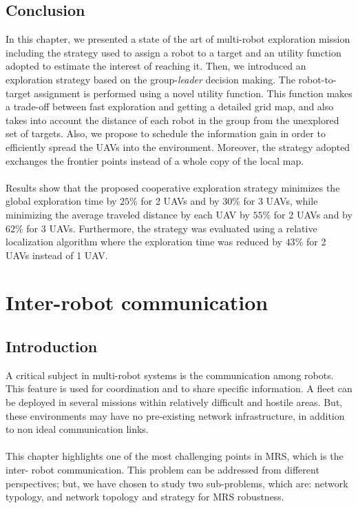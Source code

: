 \documentclass[11pt,openany]{book}
\begin{document}
\section{Conclusion}
In this chapter, we presented a state of the art of multi-robot exploration mission including the strategy used to assign a robot to a target and an utility function adopted to estimate the interest of reaching it. Then, we introduced an exploration strategy based on the group-\textit{leader} decision making. The robot-to-target assignment is performed using a novel utility function. This function makes a trade-oﬀ between fast exploration and getting a detailed grid map, and also takes into account the distance of each robot in the group from the unexplored set of targets. Also, we propose to schedule the information gain in order to efficiently spread the UAVs into the environment. Moreover, the strategy adopted exchanges the frontier points instead of a whole copy of the local map.\\\\
Results show that the proposed cooperative exploration strategy minimizes the global exploration time by $25\%$ for 2 UAVs and by $30\%$ for 3 UAVs, while minimizing the average traveled distance by each UAV by $55\%$ for 2 UAVs and by $62\%$ for 3 UAVs. Furthermore, the strategy was evaluated using a relative localization algorithm where the exploration time was reduced by $43\%$ for 2 UAVs instead of 1 UAV.
\chapter{Inter-robot communication}
\section{Introduction}
A critical subject in multi-robot systems is the communication among robots. This feature is used for coordination and to share speciﬁc information. A ﬂeet can be deployed in several missions within relatively diﬃcult and hostile areas. But, these environments may have no pre-existing network infrastructure, in addition to non ideal communication links.\\\\
This chapter highlights one of the most challenging points in MRS, which is the inter- robot communication. This problem can be addressed from diﬀerent perspectives; but, we have chosen to study two sub-problems, which are: network typology, and network topology and strategy for MRS robustness.
\end{document}
